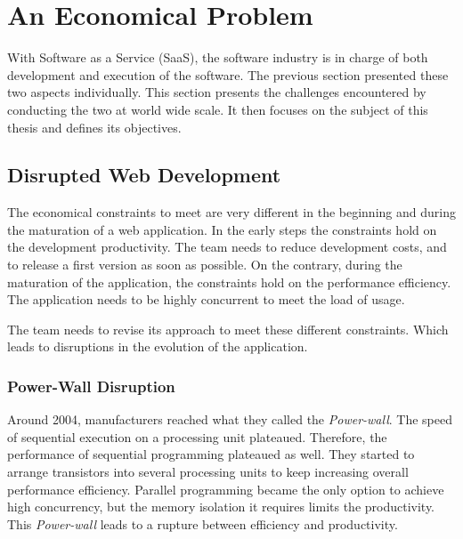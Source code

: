 \section{An Economical Problem} \label{chapter2:problem-statement}

With Software as a Service (SaaS), the software industry is in charge of both development and execution of the software.
The previous section presented these two aspects individually.
This section presents the challenges encountered by conducting the two at world wide scale.
It then focuses on the subject of this thesis and defines its objectives.

\subsection{Disrupted Web Development}

The economical constraints to meet are very different in the beginning and during the maturation of a web application.
In the early steps the constraints hold on the development productivity.
The team needs to reduce development costs, and to release a first version as soon as possible.
On the contrary, during the maturation of the application, the constraints hold on the performance efficiency.
The application needs to be highly concurrent to meet the load of usage.

The team needs to revise its approach to meet these different constraints.
Which leads to disruptions in the evolution of the application.

\subsubsection{Power-Wall Disruption}


Around 2004, manufacturers reached what they called the \textit{Power-wall}.
The speed of sequential execution on a processing unit plateaued.
Therefore, the performance of sequential programming plateaued as well.
They started to arrange transistors into several processing units to keep increasing overall performance efficiency.
Parallel programming became the only option to achieve high concurrency, but the memory isolation it requires limits the productivity.
This \textit{Power-wall} leads to a rupture between efficiency and productivity.


